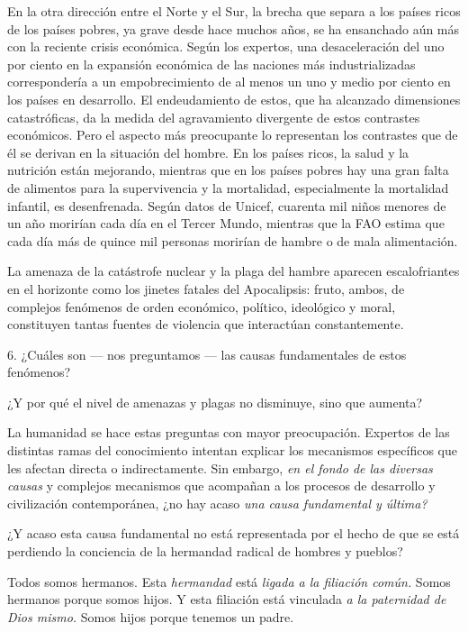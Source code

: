 \begin{body}
	En la otra dirección entre el Norte y el Sur, la brecha que separa a los países ricos de los países pobres, ya grave desde hace muchos años, se ha ensanchado aún más con la reciente crisis económica. Según los expertos, una desaceleración del uno por ciento en la expansión económica de las naciones más industrializadas correspondería a un empobrecimiento de al menos un uno y medio por ciento en los países en desarrollo. El endeudamiento de estos, que ha alcanzado dimensiones catastróficas, da la medida del agravamiento divergente de estos contrastes económicos. Pero el aspecto más preocupante lo representan los contrastes que de él se derivan en la situación del hombre. En los países ricos, la salud y la nutrición están mejorando, mientras que en los países pobres hay una gran falta de alimentos para la supervivencia y la mortalidad, especialmente la mortalidad infantil, es desenfrenada. Según datos de Unicef, cuarenta mil niños menores de un año morirían cada día en el Tercer Mundo, mientras que la FAO estima que cada día más de quince mil personas morirían de hambre o de mala alimentación.
	
	La amenaza de la catástrofe nuclear y la plaga del hambre aparecen escalofriantes en el horizonte como los jinetes fatales del Apocalipsis: fruto, ambos, de complejos fenómenos de orden económico, político, ideológico y moral, constituyen tantas fuentes de violencia que interactúan constantemente.
	
	6. ¿Cuáles son --- nos preguntamos --- las causas fundamentales de estos fenómenos?
	
	¿Y por qué el nivel de amenazas y plagas no disminuye, sino que aumenta?
	
	La humanidad se hace estas preguntas con mayor preocupación. Expertos de las distintas ramas del conocimiento intentan explicar los mecanismos específicos que les afectan directa o indirectamente. Sin embargo, \emph{en el fondo de las diversas causas} y complejos mecanismos que acompañan a los procesos de desarrollo y civilización contemporánea, ¿no hay acaso \emph{una causa fundamental y última?}
	
	¿Y acaso esta causa fundamental no está representada por el hecho de que se está perdiendo la conciencia de la hermandad radical de hombres y pueblos?
	
	Todos somos hermanos. Esta \emph{hermandad} está \emph{ligada a la 	filiación común.} Somos hermanos porque somos hijos. Y esta filiación está vinculada \emph{a la paternidad de Dios mismo.} Somos hijos porque tenemos un padre.
	

\end{body}
